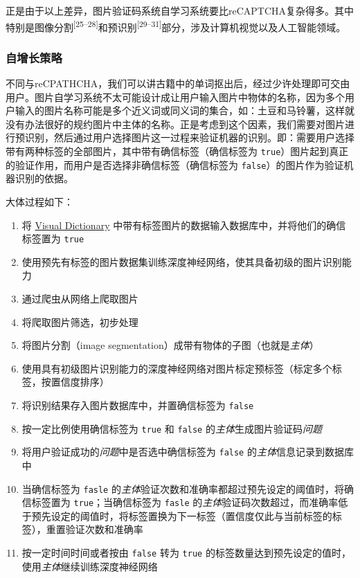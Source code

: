 \documentclass[bachelor,zhspacing]{cqu}  %
\def\tightlist{}
\begin{document}
正是由于以上差异，图片验证码系统自学习系统要比reCAPTCHA复杂得多。其中特别是图像分割\textsuperscript{{[}25--28{]}}和预识别\textsuperscript{{[}29--31{]}}部分，涉及计算机视觉以及人工智能领域。

\subsubsection{自增长策略}\label{ux81eaux589eux957fux7b56ux7565}

不同与reCPATHCHA，我们可以讲古籍中的单词抠出后，经过少许处理即可交由用户。图片自学习系统不太可能设计成让用户输入图片中物体的名称，因为多个用户输入的图片名称可能是多个近义词或同义词的集合，如：土豆和马铃薯，这样就没有办法很好的规约图片中主体的名称。正是考虑到这个因素，我们需要对图片进行预识别，然后通过用户选择图片这一过程来验证机器的识别。即：需要用户选择带有两种标签的全部图片，其中带有确信标签（确信标签为
\texttt{true}）图片起到真正的验证作用，而用户是否选择非确信标签（确信标签为
\texttt{false}）的图片作为验证机器识别的依据。

大体过程如下：

\begin{enumerate}
\def\labelenumi{\arabic{enumi}.}
\tightlist
\item
  将 \href{http://groups.csail.mit.edu/vision/TinyImages/}{Visual
  Dictionary} 中带有标签图片的数据输入数据库中，并将他们的确信标签置为
  \texttt{true}
\item
  使用预先有标签的图片数据集训练深度神经网络，使其具备初级的图片识别能力
\item
  通过爬虫从网络上爬取图片
\item
  将爬取图片筛选，初步处理
\item
  将图片分割（image segmentation）成带有物体的子图（也就是\emph{主体}）
\item
  使用具有初级图片识别能力的深度神经网络对图片标定预标签（标定多个标签，按置信度排序）
\item
  将识别结果存入图片数据库中，并置确信标签为 \texttt{false}
\item
  按一定比例使用确信标签为 \texttt{true} 和 \texttt{false}
  的\emph{主体}生成图片验证码\emph{问题}
\item
  将用户验证成功的\emph{问题}中是否选中确信标签为 \texttt{false}
  的\emph{主体}信息记录到数据库中
\item
  当确信标签为 \texttt{fasle}
  的\emph{主体}验证次数和准确率都超过预先设定的阈值时，将确信标签置为
  \texttt{true}；当确信标签为 \texttt{fasle}
  的\emph{主体}验证码次数超过，而准确率低于预先设定的阈值时，将标签置换为下一标签（置信度仅此与当前标签的标签），重置验证次数和准确率
\item
  按一定时间时间或者按由 \texttt{false} 转为 \texttt{true}
  的标签数量达到预先设定的值时，使用\emph{主体}继续训练深度神经网络
\end{enumerate}
\end{document}
